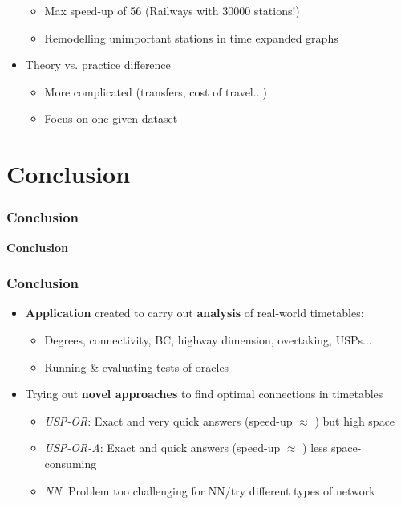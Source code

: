 \documentclass[]{beamer}
\begin{document}
\begin{frame}
\begin{itemize}
		        \begin{itemize}
					\item Max speed-up of 56 (Railways with 30000 stations!)
					\item Remodelling unimportant stations in time expanded graphs
				\end{itemize}
				\item<3-> Theory vs. practice difference
				\begin{itemize}
					\item More complicated (transfers, cost of travel...)
					\item Focus on one given dataset
				\end{itemize}
			\end{itemize}
        \end{frame}         
    
    \section{Conclusion}
    \begin{frame}
        \frametitle{Conclusion}
        \begin{center}
            \textcolor{elcon-clr!80!black}{\textbf{Conclusion}}
        \end{center}
    \end{frame}
    
        \begin{frame}
            \frametitle{Conclusion}
            \begin{itemize}
				\item \textbf{Application} created to carry out \textbf{analysis} of real-world timetables:
				\begin{itemize}
					\item Degrees, connectivity, BC, highway dimension, overtaking, USPs...
					\item Running \& evaluating tests of oracles
				\end{itemize}
				\item<2-> Trying out \textbf{novel approaches} to find optimal connections in timetables
				\begin{itemize}
					\item \textit{USP-OR}: Exact and very quick answers (speed-up $\approx$ ) but high space
					\item \textit{USP-OR-A}: Exact and quick answers (speed-up $\approx$ ) less space-consuming
					\item \textit{NN}: Problem too challenging for NN/try different types of network
				\end{itemize}
			\end{itemize}
        \end{frame}
        
\end{document}
